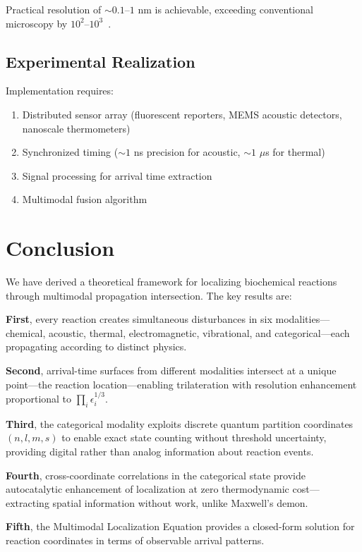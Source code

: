 \documentclass[11pt,a4paper]{article}
\theoremstyle{remark}
\begin{document}
Practical resolution of $\sim 0.1$--$1$ nm is achievable, exceeding conventional microscopy by $10^2$--$10^3$~\citep{hell1994breaking,betzig2006imaging}.

\subsection{Experimental Realization}

Implementation requires:
\begin{enumerate}
    \item Distributed sensor array (fluorescent reporters, MEMS acoustic detectors, nanoscale thermometers)
    \item Synchronized timing ($\sim 1$ ns precision for acoustic, $\sim 1$ $\mu$s for thermal)
    \item Signal processing for arrival time extraction
    \item Multimodal fusion algorithm
\end{enumerate}

\section{Conclusion}

We have derived a theoretical framework for localizing biochemical reactions through multimodal propagation intersection. The key results are:

\textbf{First}, every reaction creates simultaneous disturbances in six modalities---chemical, acoustic, thermal, electromagnetic, vibrational, and categorical---each propagating according to distinct physics.

\textbf{Second}, arrival-time surfaces from different modalities intersect at a unique point---the reaction location---enabling trilateration with resolution enhancement proportional to $\prod_i \epsilon_i^{1/3}$.

\textbf{Third}, the categorical modality exploits discrete quantum partition coordinates $(n, l, m, s)$ to enable exact state counting without threshold uncertainty, providing digital rather than analog information about reaction events.

\textbf{Fourth}, cross-coordinate correlations in the categorical state provide autocatalytic enhancement of localization at zero thermodynamic cost---extracting spatial information without work, unlike Maxwell's demon.

\textbf{Fifth}, the Multimodal Localization Equation provides a closed-form solution for reaction coordinates in terms of observable arrival patterns.
\end{document}
